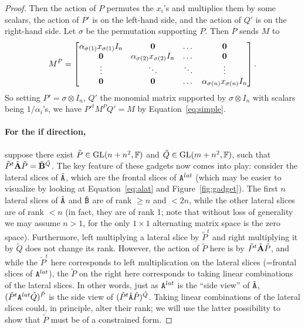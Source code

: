 \documentclass[11pt]{article}
\begin{document}
\begin{proof}
Then the action of $P$ permutes the $x_i$'s and multiplies them by some scalars, 
the action of $P'$ is on the left-hand 
side, and the action of $Q'$ is on the right-hand side. Let $\sigma$ be 
the permutation supporting $P$. Then $P$ sends $M$ to 
$$
M^P=\begin{bmatrix}
\alpha_{\sigma(1)}x_{\sigma(1)} I_n & \mathbf{0} & \dots & \mathbf{0} \\
\mathbf{0} & \alpha_{\sigma(2)}x_{\sigma(2)} I_n & \dots & \mathbf{0} \\
\vdots & \ddots & \ddots & \vdots \\
\mathbf{0} & \mathbf{0} & \dots & \alpha_{\sigma(n)}x_{\sigma(n)} I_n
\end{bmatrix}.
$$
So setting $P'=\sigma\otimes I_n$, $Q'$ the monomial matrix supported by 
$\sigma\otimes I_n$ with scalars being $1/\alpha_i$'s, we have $P'^tM^P 
Q'=M$ by 
Equation~\ref{eq:simple}.

\paragraph{For the if direction,} suppose there exist $\tilde P\in 
\mathrm{GL}(n+n^2, \mathbb{F})$ and $\tilde 
Q\in \mathrm{GL}(m+n^2, \mathbb{F})$, such that $\tilde P^t\tilde{\mathbf{A}}\tilde P =\tilde{\mathbf{B}}^{\tilde 
Q}$. The key feature of these gadgets now comes into play: consider the lateral 
slices of $\tilde{\mathtt{A}}$, which are the frontal slices of $\mathtt{A}^{lat}$ (which may be 
easier to visualize by looking at Equation~\ref{eq:alat} and Figure~\ref{fig:gadget}). 
The first $n$ lateral slices of 
$\tilde{\mathtt{A}}$ and $\tilde{\mathtt{B}}$ are of rank $\geq n$ and $<2n$, while the other 
lateral slices are of rank $<n$ (in fact, they are of rank 1; note that without loss of generality we may assume $n > 1$, for the only $1 \times 
1$ alternating matrix space is the zero space). 
Furthermore, left multiplying a lateral slice by $\tilde P^t$ and right
multiplying it by $\tilde Q$ does not change its rank. However, the action of $\tilde P$ here is by $\tilde P^t \tilde {\mathbf{A}} \tilde P$, and while the $\tilde P^t$ here corresponds to left multiplication on the lateral slices (=frontal slices of $\mathtt{A}^{lat}$), the $\tilde P$ on the right here corresponds to taking linear combinations of the lateral slices. In other words, just as $\mathtt{A}^{lat}$ is the ``side view'' of $\tilde {\mathtt{A}}$, $(\tilde P^t \mathtt{A}^{lat} \tilde Q)^{\tilde P}$ is the side view of $(\tilde P^t \tilde {\mathtt{A}} \tilde P)^{\tilde Q}$. Taking linear combinations of the lateral slices could, in principle, alter their rank; we will use the latter possibility to show that $\tilde P$ must be of a constrained form.


\end{proof}
\end{document}
